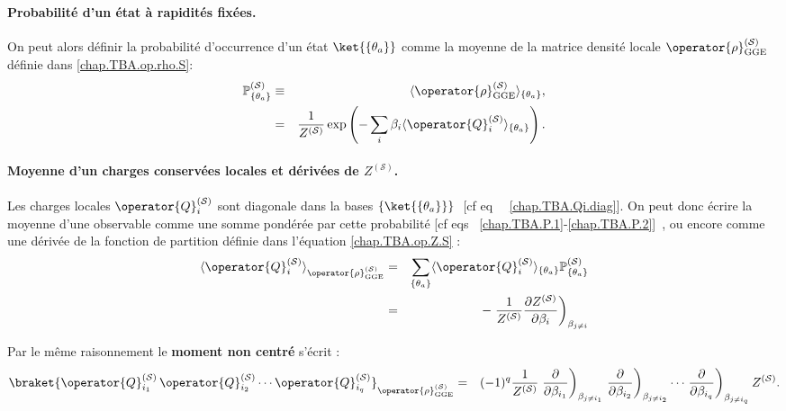 \paragraph{Probabilité d’un état à rapidités fixées.}
On peut alors définir la probabilité d’occurrence d’un état $\ket{\{ \theta_a \} }$ comme la moyenne de la matrice densité locale $\operator{\rho}^{(\mathcal{S})}_{\mathrm{GGE}}$ définie dans \eqref{chap.TBA.op.rho.S}:
\begin{eqnarray}
	\mathbb{P}^{(\mathcal{S})}_{\{ \theta_a \}}  & \equiv &  \langle \operator{\rho}^{(\mathcal{S})}_{\mathrm{GGE}} \rangle_{\{\theta_a \}}, \label{chap.TBA.P.1}\\
	& = & 
	\frac{1}{Z^{(\mathcal{S})}} \exp \left (- \sum_i \beta_i \langle \operator{Q}_i^{(\mathcal{S})} \rangle_{\{\theta_a \}} \right ) \label{chap.TBA.P.2}.
\end{eqnarray}

\paragraph{Moyenne d’un charges conservées locales et dérivées de $Z^{(\mathcal{S})}$.} Les charges locales $\operator{Q}_i^{(\mathcal{S})}$ sont diagonale dans la bases \( \{ \ket{\{\theta_a \}} \}  \) [cf eq~ ~\eqref{chap.TBA.Qi.diag}]. 
On peut donc  écrire la moyenne d’une observable comme une somme pondérée par cette probabilité [cf eqs ~\eqref{chap.TBA.P.1}-\eqref{chap.TBA.P.2}] , ou encore comme une dérivée de la fonction de partition définie dans l'équation \eqref{chap.TBA.op.Z.S} :
\begin{eqnarray}
	\langle \operator{Q}_i^{(\mathcal{S})} \rangle_{\operator{\rho}^{(\mathcal{S})}_{\mathrm{GGE}}} &= & \sum_{\{ \theta_a\}} \langle \operator{Q}_i^{(\mathcal{S})} \rangle_{\{\theta_a \}} \mathbb{P}^{(\mathcal{S})}_{\{ \theta_a \}} \label{chap.TBA.moy.1}\\
	 & = &  -\left. \frac{1}{Z^{(\mathcal{S})}} \frac{\partial Z^{(\mathcal{S})}}{\partial \beta_i} \right )_{\beta_{j \neq i }}	 \label{chap.TBA.moy.2}
\end{eqnarray}

Par le même raisonnement le {\bf moment non centré} s'écrit :
\begin{eqnarray}
	\braket{ \operator{Q}_{i_1}^{(\mathcal{S})} \, \operator{Q}_{i_2}^{(\mathcal{S})} \cdots \operator{Q}_{i_q}^{(\mathcal{S})} }_{\operator{\rho}^{(\mathcal{S})}_{\mathrm{GGE}}} &= &  (-1)^q \frac{1}{Z^{(\mathcal{S})}} \left.\frac{\partial}{\partial \beta_{i_1}} \right )_{\beta_{j \neq i_1 }} \left.\frac{\partial}{\partial \beta_{i_2}} \right )_{\beta_{j \neq i_2 }} \cdots \left.\frac{\partial}{\partial \beta_{i_q}} \right )_{\beta_{j \neq i_q }} Z^{(\mathcal{S})} \label{chap.TBA.mom.1}.	
\end{eqnarray}

